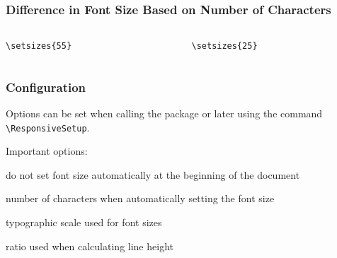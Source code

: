 \begin{frame}[fragile]
  \frametitle{Difference in Font Size Based on Number of Characters}
\begin{columns}
  \begin{column}{0.5\textwidth}
\begin{verbatim}
\setsizes{55}
\end{verbatim}

\end{column}
\begin{column}{0.5\textwidth}
\begin{verbatim}
\setsizes{25}
\end{verbatim}

\end{column}
\end{columns}
\end{frame}

\begin{frame}[fragile]
  \frametitle{Configuration}
  Options can be set when calling the package or later using the command \verb|\ResponsiveSetup|.

  \bigskip

  Important options:

  \begin{description}[noautomatic]
    \item[noautomatic] do not set font size automatically at the beginning of the document
    \item[characters] number of characters when automatically setting the font size
    \item[scale] typographic scale used for font sizes
    \item[lineratio] ratio used when calculating line height
  \end{description}

\end{frame}

